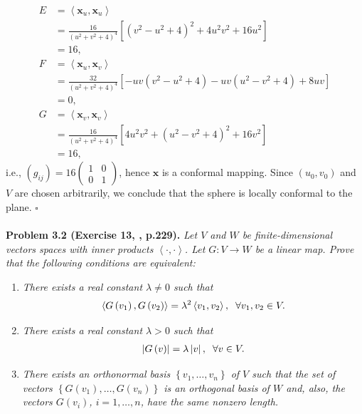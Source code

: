 \documentclass[a4paper]{article}
\numberwithin{equation}{section}
\begin{document}
\begin{align}
E &= \left\langle {{\mathbf{x}_u},{\mathbf{x}_u}} \right\rangle \\
 &= \frac{{16}}{{{{\left( {{u^2} + {v^2} + 4} \right)}^4}}}\left[ {{{\left( {{v^2} - {u^2} + 4} \right)}^2} + 4{u^2}{v^2} + 16{u^2}} \right]\\
 &= 16,\\
F &= \left\langle {{\mathbf{x}_u},{\mathbf{x}_v}} \right\rangle \\
 &= \frac{{32}}{{{{\left( {{u^2} + {v^2} + 4} \right)}^4}}}\left[ { - uv\left( {{v^2} - {u^2} + 4} \right) - uv\left( {{u^2} - {v^2} + 4} \right) + 8uv} \right]\\
 &= 0,\\
G &= \left\langle {{\mathbf{x}_v},{\mathbf{x}_v}} \right\rangle \\
 &= \frac{{16}}{{{{\left( {{u^2} + {v^2} + 4} \right)}^4}}}\left[ {4{u^2}{v^2} + {{\left( {{u^2} - {v^2} + 4} \right)}^2} + 16{v^2}} \right]\\
 &= 16,
\end{align}
i.e., $\left( {{g_{ij}}} \right) = 16\left( {\begin{array}{*{20}{c}}
1&0\\
0&1
\end{array}} \right)$, hence $\mathbf{x}$ is a conformal mapping. Since $\left(u_0,v_0\right)$ and $V$ are chosen arbitrarily, we conclude that the sphere is locally conformal to the plane. \hfill $\square$\\
\\
\textbf{Problem 3.2 (Exercise 13, \cite{2}, p.229).} \textit{Let $V$ and $W$ be finite-dimensional vectors spaces with inner products $\left\langle { \cdot , \cdot } \right\rangle $. Let $G:V\to W$ be a linear map. Prove that the following conditions are equivalent:}
\begin{enumerate}
\item \textit{There exists a real constant $\lambda \ne 0$ such that}
\begin{align}
\left\langle {G\left( {{v_1}} \right),G\left( {{v_2}} \right)} \right\rangle  = {\lambda ^2}\left\langle {{v_1},{v_2}} \right\rangle ,\hspace{0.2cm}\forall {v_1},{v_2} \in V.
\end{align}
\item \textit{There exists a real constant $\lambda >0$ such that}
\begin{align}
\left| {G\left( v \right)} \right| = \lambda \left| v \right|,\hspace{0.2cm}\forall v \in V.
\end{align}
\item \textit{There exists an orthonormal basis $\left\{ {{v_1}, \ldots ,{v_n}} \right\}$ of $V$ such that the set of vectors $\left\{ {G\left( {{v_1}} \right), \ldots ,G\left( {{v_n}} \right)} \right\}$ is an orthogonal basis of $W$ and, also, the vectors $G\left(v_i\right)$, $i=1,\ldots ,n$, have the same nonzero length.}
\end{enumerate}
\end{document}
